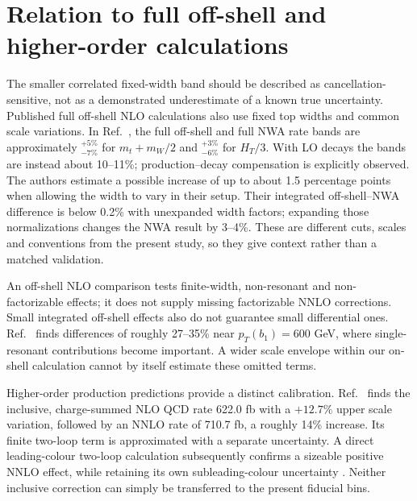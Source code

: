 \documentclass[11pt,a4paper]{article}
\begin{document}
\begin{table}[htbp]\centering\small
\resizebox{\linewidth}{!}{}
\caption{Selected native two-tag invariant-mass bins. MC $S$ and MC
$\Pi$ are relative propagated errors in percent; MC $\Pi/S$ is the
absolute paired jackknife standard error of the dimensionless ratio.
The I63 interval is a scale envelope, not a statistical interval.}
\label{tab:mass}
\end{table}

\section{Relation to full off-shell and higher-order calculations}
The smaller correlated fixed-width band should be described as
cancellation-sensitive, not as a demonstrated underestimate of a known
true uncertainty. Published full off-shell NLO calculations also use
fixed top widths and common scale variations. In
Ref.~\cite{ttW2020}, the full off-shell and full NWA rate bands are
approximately ${}^{+5\%}_{-7\%}$ for $m_t+m_W/2$ and
${}^{+3\%}_{-6\%}$ for $H_T/3$. With LO decays the bands are instead
about 10--11\%; production--decay compensation is explicitly observed.
The authors estimate a possible increase of up to about 1.5 percentage
points when allowing the width to vary in their setup. Their
integrated off-shell--NWA difference is below 0.2\% with unexpanded
width factors; expanding those normalizations changes the NWA result
by 3--4\%. These are different cuts, scales and conventions from the
present study, so they give context rather than a matched validation.

An off-shell NLO comparison tests finite-width, non-resonant and
non-factorizable effects; it does not supply missing factorizable NNLO
corrections. Small integrated off-shell effects also do not guarantee
small differential ones. Ref.~\cite{ttWmodel} finds differences of
roughly 27--35\% near $p_T(b_1)=600$ GeV, where single-resonant
contributions become important. A wider scale envelope within our
on-shell calculation cannot by itself estimate these omitted terms.

Higher-order production predictions provide a distinct calibration.
Ref.~\cite{ttWNNLO} finds the inclusive, charge-summed NLO QCD rate
622.0 fb with a $+12.7\%$ upper scale variation, followed by an NNLO
rate of 710.7 fb, a roughly 14\% increase. Its finite two-loop term is
approximated with a separate uncertainty. A direct leading-colour
two-loop calculation subsequently confirms a sizeable positive NNLO
effect, while retaining its own subleading-colour uncertainty
\cite{ttWNNLO2026}. Neither inclusive correction can simply be
transferred to the present fiducial bins.
\end{document}
